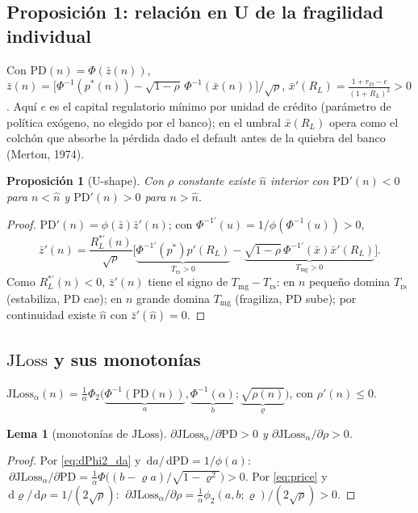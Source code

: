 \documentclass[11pt]{article}
\theoremstyle{plain}
\newtheorem{proposition}{Proposición}
\newtheorem{lemma}{Lema}
\theoremstyle{definition}
\newcommand{\JLoss}{\mathrm{JLoss}}
\newcommand{\PD}{\mathrm{PD}}
\newcommand{\1}{\mathbf{1}}
\newcommand{\dd}{\,\mathrm{d}}
\begin{document}
\subsection{Proposición 1: relación en U de la fragilidad individual}
Con $\PD(n)=\Phi(\bar z(n))$, $\bar z(n)=\big[\Phi^{-1}(p^*(n))-\sqrt{1-\rho}\,\Phi^{-1}(\bar x(n))\big]/\sqrt{\rho}$, $\bar x'(R_L)=\frac{1+r_D-e}{(1+R_L)^2}>0$. Aquí $e$ es el capital regulatorio mínimo por unidad de crédito (parámetro de política exógeno, no elegido por el banco); en el umbral $\bar x(R_L)$ opera como el colchón que absorbe la pérdida dado el default antes de la quiebra del banco (Merton, 1974).
\begin{proposition}[U-shape]\label{prop:U}
Con $\rho$ constante existe $\hat n$ interior con $\PD'(n)<0$ para $n<\hat n$ y $\PD'(n)>0$ para $n>\hat n$.
\end{proposition}
\begin{proof}
$\PD'(n)=\phi(\bar z)\bar z'(n)$; con $\Phi^{-1\prime}(u)=1/\phi(\Phi^{-1}(u))>0$,
\[
\bar z'(n)=\frac{R_L^{*\prime}(n)}{\sqrt\rho}\big[\underbrace{\Phi^{-1\prime}(p^*)p'(R_L)}_{T_{\text{rs}}>0}-\underbrace{\sqrt{1-\rho}\,\Phi^{-1\prime}(\bar x)\bar x'(R_L)}_{T_{\text{mg}}>0}\big].
\]
Como $R_L^{*\prime}(n)<0$, $\bar z'(n)$ tiene el signo de $T_{\text{mg}}-T_{\text{rs}}$: en $n$ pequeño domina $T_{\text{rs}}$ (estabiliza, $\PD$ cae); en $n$ grande domina $T_{\text{mg}}$ (fragiliza, $\PD$ sube); por continuidad existe $\hat n$ con $\bar z'(\hat n)=0$.
\end{proof}

\subsection{$\JLoss$ y sus monotonías}\label{sec:jl}
$\displaystyle \JLoss_\alpha(n)=\frac1\alpha\Phi_2\big(\underbrace{\Phi^{-1}(\PD(n))}_{a},\underbrace{\Phi^{-1}(\alpha)}_{b};\underbrace{\sqrt{\rho(n)}}_{\varrho}\big)$, con $\rho'(n)\le0$.
\begin{lemma}[monotonías de $\JLoss$]\label{lem:jl}
$\partial\JLoss_\alpha/\partial\PD>0$ y $\partial\JLoss_\alpha/\partial\rho>0$.
\end{lemma}
\begin{proof}
Por \eqref{eq:dPhi2_da} y $\dd a/\dd\PD=1/\phi(a)$: $\ \partial\JLoss_\alpha/\partial\PD=\frac1\alpha\Phi\big((b-\varrho a)/\sqrt{1-\varrho^2}\big)>0.$ Por \eqref{eq:price} y $\dd\varrho/\dd\rho=1/(2\sqrt\rho)$: $\ \partial\JLoss_\alpha/\partial\rho=\frac1\alpha\phi_2(a,b;\varrho)/(2\sqrt\rho)>0.$
\end{proof}
\end{document}
